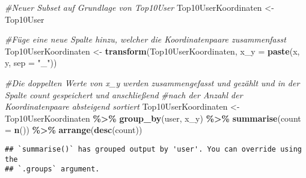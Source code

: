 \documentclass[
]{article}
\newenvironment{Shaded}{\begin{snugshade}}{\end{snugshade}}
\newcommand{\AttributeTok}[1]{\textcolor[rgb]{0.13,0.29,0.53}{#1}}
\newcommand{\CommentTok}[1]{\textcolor[rgb]{0.56,0.35,0.01}{\textit{#1}}}
\newcommand{\FunctionTok}[1]{\textcolor[rgb]{0.13,0.29,0.53}{\textbf{#1}}}
\newcommand{\NormalTok}[1]{#1}
\newcommand{\OtherTok}[1]{\textcolor[rgb]{0.56,0.35,0.01}{#1}}
\newcommand{\SpecialCharTok}[1]{\textcolor[rgb]{0.81,0.36,0.00}{\textbf{#1}}}
\newcommand{\StringTok}[1]{\textcolor[rgb]{0.31,0.60,0.02}{#1}}
\begin{document}
\begin{Shaded}
\begin{Highlighting}[]
\CommentTok{\#Neuer Subset auf Grundlage von Top10User}
\NormalTok{Top10UserKoordinaten }\OtherTok{\textless{}{-}}\NormalTok{ Top10User}

\CommentTok{\#Füge eine neue Spalte hinzu, welcher die Koordinatenpaare zusammenfasst}
\NormalTok{Top10UserKoordinaten }\OtherTok{\textless{}{-}} \FunctionTok{transform}\NormalTok{(Top10UserKoordinaten, }\AttributeTok{x\_y =} \FunctionTok{paste}\NormalTok{(x, y, }\AttributeTok{sep =} \StringTok{"\_"}\NormalTok{))}

\CommentTok{\#Die doppelten Werte von x\_y werden zusammengefasst und gezählt und in der Spalte count gespeichert und anschließend}
\CommentTok{\#nach der Anzahl der Koordinatenpaare absteigend sortiert}
\NormalTok{Top10UserKoordinaten }\OtherTok{\textless{}{-}}\NormalTok{ Top10UserKoordinaten }\SpecialCharTok{\%\textgreater{}\%} \FunctionTok{group\_by}\NormalTok{(user, x\_y) }\SpecialCharTok{\%\textgreater{}\%} \FunctionTok{summarise}\NormalTok{(}\AttributeTok{count =} \FunctionTok{n}\NormalTok{()) }\SpecialCharTok{\%\textgreater{}\%} \FunctionTok{arrange}\NormalTok{(}\FunctionTok{desc}\NormalTok{(count))}
\end{Highlighting}
\end{Shaded}

\begin{verbatim}
## `summarise()` has grouped output by 'user'. You can override using the
## `.groups` argument.
\end{verbatim}
\end{document}
